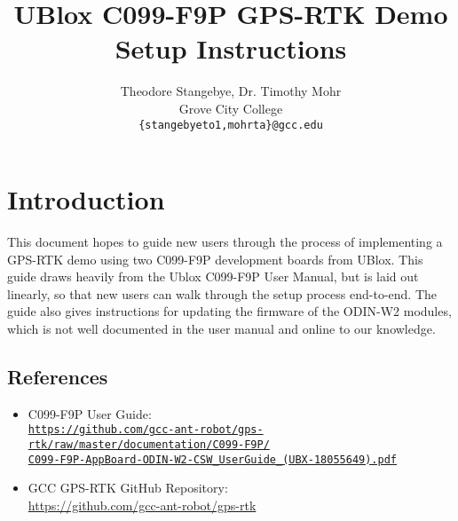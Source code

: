 \documentclass{article}%
\begin{document}
\title{UBlox C099-F9P GPS-RTK Demo Setup Instructions}
\author{Theodore Stangebye, Dr. Timothy Mohr\\
Grove City College\\
\texttt{\{stangebyeto1,mohrta\}@gcc.edu}}
\maketitle






\vspace*{\fill}
\tableofcontents
\vspace*{\fill}

\newpage

\section{Introduction}
This document hopes to guide new users through the process of implementing a GPS-RTK demo using two C099-F9P development boards from UBlox. 
This guide draws heavily from the Ublox C099-F9P User Manual, but is laid out linearly, so that new users can walk through the setup process end-to-end.
The guide also gives instructions for updating the firmware of the ODIN-W2 modules, which is not well documented in the user manual and online to our knowledge.

\subsection{References}\label{ref:references}
	\begin{itemize}
		\item C099-F9P User Guide:\\ \href{https://github.com/gcc-ant-robot/gps-rtk/raw/master/documentation/C099-F9P/C099-F9P-AppBoard-ODIN-W2-CSW_UserGuide_(UBX-18055649).pdf}{\texttt{https://github.com/gcc-ant-robot/gps-rtk/raw/master/documentation/C099-F9P/\\C099-F9P-AppBoard-ODIN-W2-CSW\_UserGuide\_(UBX-18055649).pdf}}
		\item GCC GPS-RTK GitHub Repository: \\
		\url{https://github.com/gcc-ant-robot/gps-rtk}
	\end{itemize}
\end{document}
